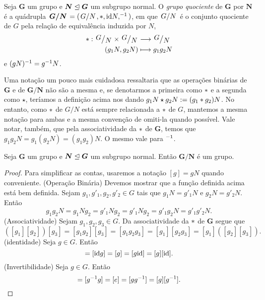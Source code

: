 \begin{defi}
Seja $\bm G$ um grupo e $\bm N \mathrel{\unlhd} \bm G$ um subgrupo normal. O \emph{grupo quociente} de $\bm G$ por $\bm N$ é a quádrupla $\bm{\quo{G}{N}}=(\quo{G}{N},\opb,\id N,\inv)$, em que $\quo{G}{N}$ é o conjunto quociente de $G$ pela relação de equivalência induzida por $N$,
	\begin{align*}
	\func{\opb}{\quo{G}{N} \times \quo{G}{N}}{\quo{G}{N}}{(g_1N,g_2N)}{g_1g_2N}
	\end{align*}
e $(gN)^{-1}=g^{-1} N$.
\end{defi}

Uma notação um pouco mais cuidadosa ressaltaria que as operações binárias de $\bm G$ e de $\bm{G/N}$ não são a mesma e, se denotarmos a primeira como $\ast$ e a segunda como $\star$, teríamos a definição acima nos dando $g_1N \star g_2N := (g_1 \ast g_2)N$. No entanto, como $\ast$ de $G/N$ está sempre relacionada a $\ast$ de $G$, mantemos a mesma notação para ambas e a mesma convenção de omiti-la quando possível. Vale notar, também, que pela associatividade da $\ast$ de $\bm G$, temos que $g_1g_2N=g_1(g_2N)=(g_1g_2)N$. O mesmo vale para $^{-1}$.

\begin{prop}
Seja $\bm G$ um grupo e $\bm N \mathrel{\unlhd} \bm G$ um subgrupo normal. Então $\bm{G/N}$ é um grupo.
\end{prop}
\begin{proof}
Para simplificar as contas, usaremos a notação $[g]=gN$ quando conveniente.
(Operação Binária) Devemos mostrar que a função definida acima está bem definida. Sejam $g_1,g'_1,g_2,g'_2 \in G$ tais que $g_1N=g'_1N$ e $g_2N=g'_2N$. Então
	\begin{equation*}
	g_1g_2N = g_1Ng_2 = g'_1Ng_2 = g'_1Ng_2 = g'_1g_2N=g'_1g'_2N.
	\end{equation*}
(Associatividade) Sejam $g_1,g_2,g_3 \in G$. Da associatividade da $\ast$ de $\bm G$ segue que
	\begin{equation*}
	([g_1][g_2])[g_3] = [g_1g_2][g_3] = [g_1g_2g_3] = [g_1][g_2g_3] = [g_1]([g_2] [g_3]).
	\end{equation*}
(identidade) Seja $g \in G$. Então
	\begin{equation*}
	[\id][g] = [\id g] = [g] = [g\id] = [g][\id].
	\end{equation*}
(Invertibilidade) Seja $g \in G$. Então
	\begin{equation*}
	[g\inv][g] = [g\inv g] = [e] = [gg\inv] = [g][g\inv].
	\end{equation*}
\end{proof}

